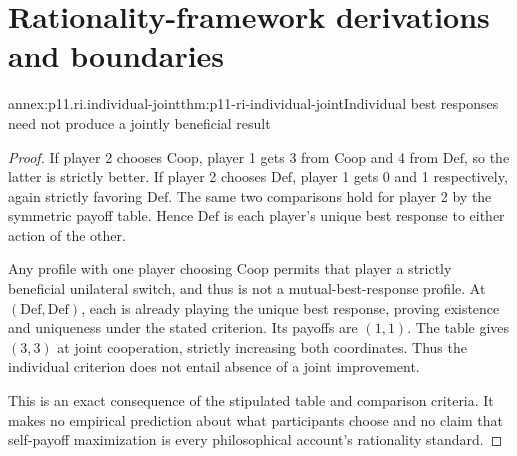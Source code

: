 \section{Rationality-framework derivations and boundaries}
\label{sec:p11-ri-proofs}

\begin{annexitem}{annex:p11.ri.individual-joint}{thm:p11-ri-individual-joint}{Individual best responses need not produce a jointly beneficial result}
\begin{proof}
If player 2 chooses \(\mathrm{Coop}\), player 1 gets 3 from
\(\mathrm{Coop}\) and 4 from \(\mathrm{Def}\), so the latter
is strictly better. If player 2 chooses \(\mathrm{Def}\),
player 1 gets 0 and 1 respectively, again strictly favoring
\(\mathrm{Def}\). The same two comparisons hold for player 2
by the symmetric payoff table. Hence \(\mathrm{Def}\) is each
player's unique best response to either action of the other.

Any profile with one player choosing \(\mathrm{Coop}\) permits
that player a strictly beneficial unilateral switch, and thus is
not a mutual-best-response profile. At
\((\mathrm{Def},\mathrm{Def})\), each is already playing the
unique best response, proving existence and uniqueness under the
stated criterion. Its payoffs are \((1,1)\).
The table gives \((3,3)\) at joint cooperation, strictly increasing
both coordinates. Thus the individual criterion does not entail
absence of a joint improvement.

This is an exact consequence of the stipulated table and comparison
criteria. It makes no empirical prediction about what participants
choose and no claim that self-payoff maximization is every
philosophical account's rationality standard.
\end{proof}
\end{annexitem}

